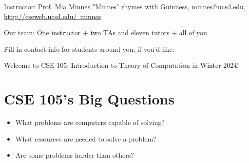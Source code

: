 Instructor: Prof. Mia Minnes {\tiny{"Minnes" rhymes with Guinness}}, minnes@ucsd.edu, 
\href{http://cseweb.ucsd.edu/~minnes}{http://cseweb.ucsd.edu/~minnes}


Our team: One instructor + two TAs and eleven tutors + all of you

Fill in contact info for students around you, if you'd like:

\vfill

\vfill

\newpage 
Welcome to CSE 105: Introduction to Theory of Computation in Winter 2024!

\section*{CSE 105's Big Questions}
\begin{itemize}
   \item What problems are computers capable of solving?
   \item What resources are needed to solve a problem?
   \item Are some problems harder than others?
\end{itemize}

